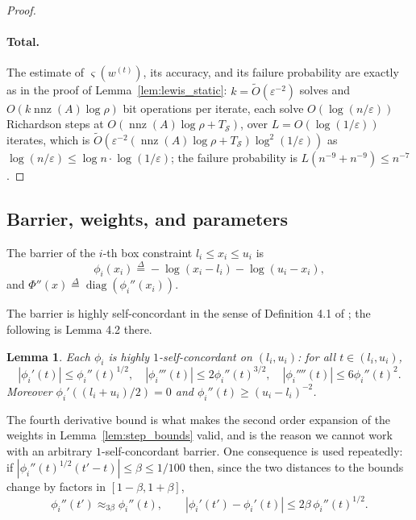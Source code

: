 \documentclass[11pt]{article}
\newtheorem{lemma}{Lemma}[section]
\newcommand{\diag}{\operatorname{diag}}
\newcommand{\nnz}{\operatorname{nnz}}
\renewcommand{\O}{\widetilde O}
\newcommand{\defeq}{\stackrel{\Delta}{=}}
\begin{document}
\begin{proof}
\paragraph{Total.}
The estimate of $\varsigma(w^{(t)})$, its accuracy, and its failure probability
are exactly as in the proof of Lemma~\ref{lem:lewis_static}:
$k = \O(\varepsilon^{-2})$ solves and
$O(k \nnz(A) \log \rho)$ bit operations per iterate, each solve
$O(\log(n / \varepsilon))$ Richardson steps at
$O(\nnz(A) \log \rho + T_{\mathcal{S}})$, over
$L = O(\log(1 / \varepsilon))$ iterates, which is
$\O(\varepsilon^{-2} (\nnz(A) \log \rho + T_{\mathcal{S}}) \log^{2}(1 / \varepsilon))$
as $\log(n / \varepsilon) \le \log n \cdot \log(1 / \varepsilon)$; the failure
probability is $L (n^{-9} + n^{-9}) \le n^{-7}$.
\end{proof}

\subsection{Barrier, weights, and parameters}

The barrier of the $i$-th box constraint
$l_i \le x_i \le u_i$ is
\[
\phi_i\left( x_i \right)
\defeq
-\log(x_i - l_i) - \log(u_i - x_i),
\]
and $\Phi''(x) \defeq \diag(\phi_i''(x_i))$.

The barrier is highly self-concordant in the sense of Definition 4.1 of
\cite{BLLSSSW21}; the following is Lemma 4.2
there.

\begin{lemma}
\label{lem:self_concordant}
Each $\phi_i$ is highly
$1$-self-concordant on
$(l_i, u_i)$: for all
$t\in(l_i,u_i)$,
\[
|\phi_i'(t)| \le \phi_i''(t)^{1/2},
\quad
|\phi_i'''(t)| \le 2 \phi_i''(t)^{3/2},
\quad
|\phi_i''''(t)| \le 6 \phi_i''(t)^{2}.
\]
Moreover $\phi_i'((l_i + u_i)/2) = 0$ and
$\phi_i''(t) \ge (u_i - l_i)^{-2}$.
\end{lemma}

The fourth derivative bound is what makes the second order expansion of the
weights in Lemma~\ref{lem:step_bounds} valid, and is the reason we cannot work
with an arbitrary $1$-self-concordant barrier.
One consequence is used repeatedly: if
$|\phi_i''(t)^{1/2} (t' - t)| \le \beta \le 1/100$ then, since the two distances
to the bounds change by factors in $[1 - \beta, 1 + \beta]$,
\begin{equation}
\label{eq:barrier_local}
\phi_i''(t') \approx_{3 \beta} \phi_i''(t),
\qquad
\left| \phi_i'(t') - \phi_i'(t) \right| \le 2 \beta \, \phi_i''(t)^{1/2} .
\end{equation}
\end{document}
